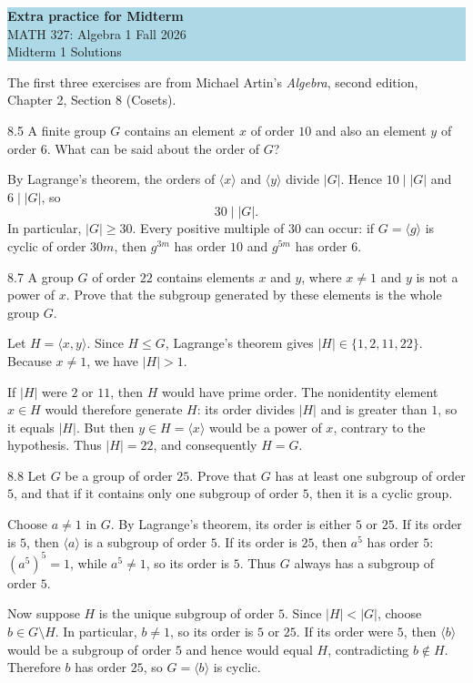 \documentclass[11pt]{article}
\begin{document}
\begin{center}
\colorbox{lightblue}{\begin{minipage}{0.92\textwidth}
\vspace{0.5em}
{\color{courseblue}\bfseries\Large Extra practice for Midterm}\\[0.4em]
MATH 327: Algebra 1 \hfill Fall 2026\\[0.2em]
Midterm 1 \hfill Solutions
\vspace{0.5em}
\end{minipage}}
\end{center}
The first three exercises are from Michael Artin's \emph{Algebra}, second edition,
Chapter 2, Section 8 (Cosets).
\begin{exercise}{8.5}
A finite group $G$ contains an element $x$ of order $10$ and also an element
$y$ of order $6$. What can be said about the order of $G$?
\end{exercise}
\begin{solution}
By Lagrange's theorem, the orders of $\langle x\rangle$ and
$\langle y\rangle$ divide $|G|$. Hence $10\mid |G|$ and $6\mid |G|$, so
\[
\boxed{30\mid |G|.}
\]
In particular, $|G|\geq30$. Every positive multiple of $30$ can occur:
if $G=\langle g\rangle$ is cyclic of order $30m$, then $g^{3m}$ has
order $10$ and $g^{5m}$ has order $6$.
\end{solution}
\begin{exercise}{8.7}
A group $G$ of order $22$ contains elements $x$ and $y$, where $x\ne1$
and $y$ is not a power of $x$. Prove that the subgroup generated by these
elements is the whole group $G$.
\end{exercise}
\begin{solution}
Let $H=\langle x,y\rangle$. Since $H\leq G$, Lagrange's theorem gives
$|H|\in\{1,2,11,22\}$. Because $x\ne1$, we have $|H|>1$.

If $|H|$ were $2$ or $11$, then $H$ would have prime order. The
nonidentity element $x\in H$ would therefore generate $H$: its order
divides $|H|$ and is greater than $1$, so it equals $|H|$.
But then $y\in H=\langle x\rangle$ would be a power of $x$, contrary
to the hypothesis. Thus $|H|=22$, and consequently $H=G$.
\end{solution}
\begin{exercise}{8.8}
Let $G$ be a group of order $25$. Prove that $G$ has at least one subgroup
of order $5$, and that if it contains only one subgroup of order $5$,
then it is a cyclic group.
\end{exercise}
\begin{solution}
Choose $a\ne1$ in $G$. By Lagrange's theorem, its order is either $5$
or $25$. If its order is $5$, then $\langle a\rangle$ is a subgroup
of order $5$. If its order is $25$, then $a^5$ has order $5$:
$(a^5)^5=1$, while $a^5\ne1$, so its order is $5$.
Thus $G$ always has a subgroup of order $5$.

Now suppose $H$ is the unique subgroup of order $5$. Since $|H|<|G|$,
choose $b\in G\setminus H$. In particular, $b\ne1$, so its order is
$5$ or $25$. If its order were $5$, then $\langle b\rangle$ would be
a subgroup of order $5$ and hence would equal $H$, contradicting
$b\notin H$. Therefore $b$ has order $25$, so
$G=\langle b\rangle$ is cyclic.
\end{solution}
\end{document}
